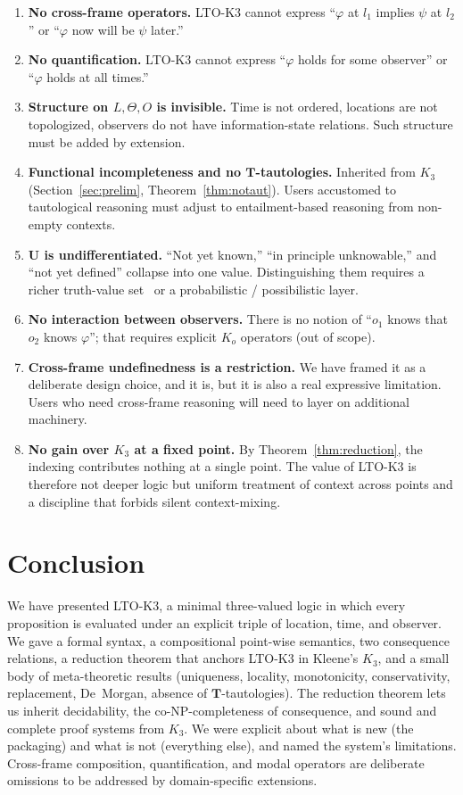 \documentclass[11pt,a4paper]{article}
\theoremstyle{definition}
\theoremstyle{plain}
\theoremstyle{remark}
\newcommand{\Tv}{\mathbf{T}}
\newcommand{\Uv}{\mathbf{U}}
\begin{document}
\begin{enumerate}
  \item \textbf{No cross-frame operators.} LTO-K3 cannot express
  ``$\varphi$ at $l_1$ implies $\psi$ at $l_2$'' or ``$\varphi$ now will
  be $\psi$ later.''
  \item \textbf{No quantification.} LTO-K3 cannot express ``$\varphi$
  holds for some observer'' or ``$\varphi$ holds at all times.''
  \item \textbf{Structure on $L, \Theta, O$ is invisible.} Time is not
  ordered, locations are not topologized, observers do not have
  information-state relations. Such structure must be added by extension.
  \item \textbf{Functional incompleteness and no $\Tv$-tautologies.}
  Inherited from $K_3$ (Section~\ref{sec:prelim},
  Theorem~\ref{thm:notaut}). Users accustomed to tautological reasoning
  must adjust to entailment-based reasoning from non-empty contexts.
  \item \textbf{$\Uv$ is undifferentiated.} ``Not yet known,'' ``in
  principle unknowable,'' and ``not yet defined'' collapse into one
  value. Distinguishing them requires a richer truth-value
  set~\cite{belnap1977} or a probabilistic / possibilistic layer.
  \item \textbf{No interaction between observers.} There is no notion of
  ``$o_1$ knows that $o_2$ knows $\varphi$''; that requires explicit
  $K_o$ operators (out of scope).
  \item \textbf{Cross-frame undefinedness is a restriction.} We have
  framed it as a deliberate design choice, and it is, but it is also a
  real expressive limitation. Users who need cross-frame reasoning will
  need to layer on additional machinery.
  \item \textbf{No gain over $K_3$ at a fixed point.} By
  Theorem~\ref{thm:reduction}, the indexing contributes nothing at a
  single point. The value of LTO-K3 is therefore not deeper logic but
  uniform treatment of context across points and a discipline that
  forbids silent context-mixing.
\end{enumerate}

\section{Conclusion}
We have presented LTO-K3, a minimal three-valued logic in which every
proposition is evaluated under an explicit triple of location, time, and
observer. We gave a formal syntax, a compositional point-wise semantics,
two consequence relations, a reduction theorem that anchors LTO-K3 in
Kleene's $K_3$, and a small body of meta-theoretic results (uniqueness,
locality, monotonicity, conservativity, replacement, De~Morgan, absence
of $\Tv$-tautologies). The reduction theorem lets us inherit decidability,
the co-NP-completeness of consequence, and sound and complete proof
systems from $K_3$. We were explicit about what is new (the packaging)
and what is not (everything else), and named the system's limitations.
Cross-frame composition, quantification, and modal operators are
deliberate omissions to be addressed by domain-specific extensions.
\end{document}
